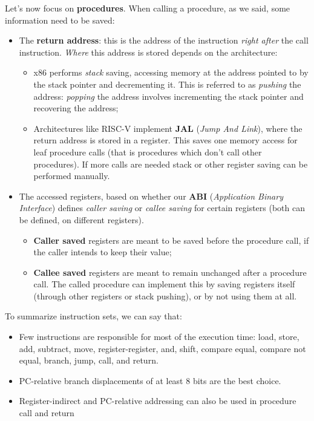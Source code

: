 \documentclass[a4paper,11pt]{article}
\begin{document}
Let's now focus on \textbf{procedures}.
When calling a procedure, as we said, some information need to be saved:
\begin{itemize}
	\item The \textbf{return address}: this is the address of the instruction \textit{right after} the call instruction. \textit{Where} this address is stored depends on the architecture:
	      \begin{itemize}
		      \item x86 performs \textit{stack} saving, accessing memory at the address pointed to by the stack pointer and decrementing it. This is referred to as \textit{pushing} the address: \textit{popping} the address involves incrementing the stack pointer and recovering the address;
		      \item Architectures like RISC-V implement \textbf{JAL} (\textit{Jump And Link}), where the return address is stored in a register. This saves one memory access for leaf procedure calls (that is procedures which don't call other procedures). If more calls are needed stack or other register saving can be performed manually.
	      \end{itemize}
	\item The accessed registers, based on whether our \textbf{ABI} (\textit{Application Binary Interface}) defines \textit{caller saving} or \textit{callee saving} for certain registers (both can be defined, on different registers).
	      \begin{itemize}
		      \item \textbf{Caller saved} registers are meant to be saved before the procedure call, if the caller intends to keep their value;
		      \item \textbf{Callee saved} registers are meant to remain unchanged after a procedure call. The called procedure can implement this by saving registers itself (through other registers or stack pushing), or by not using them at all.
	      \end{itemize}
\end{itemize}

\par\smallskip

To summarize instruction sets, we can say that:
\begin{itemize}
	\item Few instructions are responsible for most of the execution time: load, store, add, subtract, move, register-register, and, shift, compare equal, compare not equal, branch, jump, call, and return.
	\item PC-relative branch displacements of at least 8 bits are the best choice.
	\item Register-indirect and PC-relative addressing can also be used in procedure call and return
\end{itemize}
\end{document}
